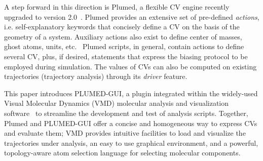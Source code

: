 \documentclass[preprint,12pt]{elsarticle}
\begin{document}
A step forward in this direction is Plumed, a flexible CV engine
recently upgraded to version 2.0~\cite{plumed2_this}. Plumed provides
an extensive set of pre-defined \emph{actions}, i.e. self-explanatory
keywords that concisely define a CV on the basis of the geometry of a
system. Auxiliary actions also exist to define center of masses, ghost
atoms, units, etc.~\cite{plumed_manual,bonomi_plumed:_2009}
Plumed scripts, in general, contain actions to define several CV,
plus, if desired, statements that express the biasing protocol to be
employed during simulation. The values of CVs can also
be computed on existing trajectories (trajectory analysis) through
its \emph{driver}  feature.

This paper introduces PLUMED-GUI, a plugin integrated within the
widely-used Visual Molecular Dynamics (VMD) molecular analysis and
visualization software~\cite{Humphrey_Dalke_Schulten_1996} to
streamline the development and test of analysis scripts.  Together,
Plumed and PLUMED-GUI offer a concise and homogeneous way to express
CVs and evaluate them; VMD provides intuitive facilities to load and
visualize the trajectories under analysis, an easy to use graphical
environment, and a powerful, topology-aware atom selection language
for selecting molecular components.











\end{document}
